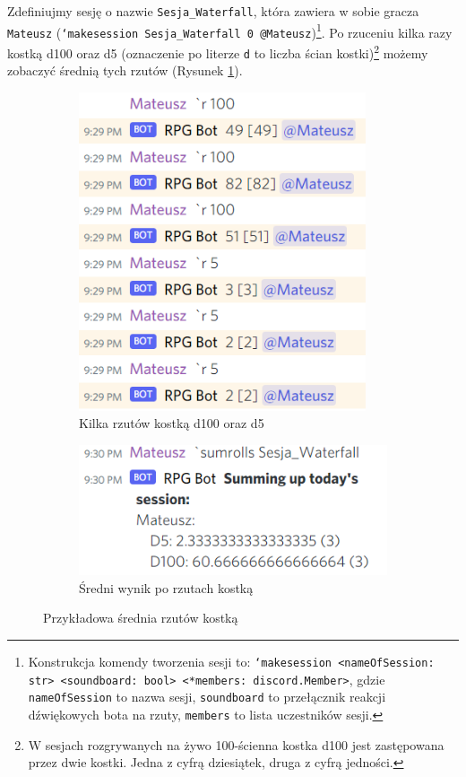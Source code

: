 \documentclass[shortabstract,inz]{iithesis}
\begin{document}
			Zdefiniujmy sesję o nazwie \texttt{Sesja\_Waterfall}, która zawiera w sobie gracza \texttt{Mateusz} (\texttt{`makesession Sesja\_Waterfall 0 @Mateusz})\footnote{Konstrukcja komendy tworzenia sesji to: \texttt{`makesession <nameOfSession: str> <soundboard: bool> <*members: discord.Member>}, gdzie \texttt{nameOfSession} to nazwa sesji, \texttt{soundboard} to przełącznik reakcji dźwiękowych bota na rzuty, \texttt{members} to lista uczestników sesji.}. Po rzuceniu kilka razy kostką d100 oraz d5 (oznaczenie po literze \texttt{d} to liczba ścian kostki)\footnote{W sesjach rozgrywanych na żywo 100-ścienna kostka d100 jest zastępowana przez dwie kostki. Jedna z cyfrą dziesiątek, druga z cyfrą jedności.} możemy zobaczyć średnią tych rzutów (Rysunek \ref{rollResult}).
			
			\begin{figure}[!h]
				\centering
				\begin{subfigure}[b]{.49\textwidth}
					\centering
					\includegraphics[width=0.93\textwidth]{rollExample}
					\caption{Kilka rzutów kostką d100 oraz d5}
				\end{subfigure}
				\hfill
				\begin{subfigure}[b]{.49\textwidth}
					\centering
					\includegraphics[width=1\textwidth]{rollsResult}
					\caption{Średni wynik po rzutach kostką}
				\end{subfigure}
				\caption{Przykładowa średnia rzutów kostką}
				\label{rollResult}
			\end{figure}
	
\end{document}
